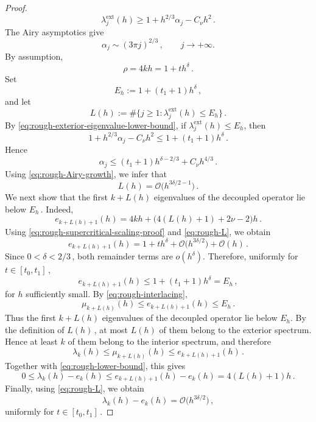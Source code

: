 \documentclass[11pt]{amsart}
\numberwithin{equation}{section}
\theoremstyle{remark}
\begin{document}
\begin{proof}
\begin{equation}
		\lambda_j^{\mathrm{ext}}(h)
		\geq
		1+h^{2/3}\alpha_j-C_\nu h^2\,.
	\end{equation}
	The Airy asymptotics give
	\begin{equation}\label{eq:rough-Airy-growth}
		\alpha_j\sim(3\pi j)^{2/3}\,,
		\qquad j\to+\infty.
	\end{equation}
	By assumption,
	\begin{equation}\label{eq:rough-supercritical-scaling-proof}
		\rho=4kh=1+th^\delta\,.
	\end{equation}
	Set
	\[
	E_h:=1+(t_1+1)h^\delta\,,
	\]
	and let
	\[
	L(h)
	:=
	\#\bigl\{j\geq1:
	\lambda_j^{\mathrm{ext}}(h)\leq E_h\bigr\}\,.
	\]
	By \eqref{eq:rough-exterior-eigenvalue-lower-bound}, if
	$\lambda_j^{\mathrm{ext}}(h)\leq E_h$, then
	\[
	1+h^{2/3}\alpha_j-C_\nu h^2
	\leq
	1+(t_1+1)h^\delta\,.
	\]
	Hence
	\[
	\alpha_j
	\leq
	(t_1+1)h^{\delta-2/3}
	+C_\nu h^{4/3}\,.
	\]
	Using \eqref{eq:rough-Airy-growth}, we infer that
	\begin{equation}\label{eq:rough-L}
		L(h)
		=
		\mathcal O\bigl(h^{3\delta/2-1}\bigr)\,.
	\end{equation}
	We next show that the first $k+L(h)$ eigenvalues of the
	decoupled operator lie below $E_h\,$. Indeed,
	\[
	e_{k+L(h)+1}(h)
	=
	4kh+
	\bigl(4(L(h)+1)+2\nu-2\bigr)h\,.
	\]
	Using \eqref{eq:rough-supercritical-scaling-proof} and
	\eqref{eq:rough-L}, we obtain
	\[
	e_{k+L(h)+1}(h)
	=
	1+th^\delta
	+\mathcal O\bigl(h^{3\delta/2}\bigr)
	+\mathcal O(h)\,.
	\]
	Since $0<\delta<2/3\,$, both remainder terms are $o(h^\delta)$.
	Therefore, uniformly for $t\in[t_0,t_1]\,$,
	\[
	e_{k+L(h)+1}(h)
	\leq
	1+(t_1+1)h^\delta
	=E_h\,,
	\]
	for $h$ sufficiently small. By \eqref{eq:rough-interlacing},
	\[
	\mu_{k+L(h)}(h)
	\leq
	e_{k+L(h)+1}(h)
	\leq E_h\,.
	\]
	Thus the first $k+L(h)$ eigenvalues of the decoupled operator lie
	below $E_h$. By the definition of $L(h)\,$, at most $L(h)$ of them
	belong to the exterior spectrum. Hence at least $k$ of them belong
	to the interior spectrum, and therefore
	\[
	\lambda_k(h)
	\leq
	\mu_{k+L(h)}(h)
	\leq
	e_{k+L(h)+1}(h)\,.
	\]
	Together with \eqref{eq:rough-lower-bound}, this gives
	\[
	0\leq\lambda_k(h)-e_k(h)
	\leq
	e_{k+L(h)+1}(h)-e_k(h)
	=
	4(L(h)+1)h\,.
	\]
	Finally, using \eqref{eq:rough-L}, we obtain
	\[
	\lambda_k(h)-e_k(h)
	=
	\mathcal O\bigl(h^{3\delta/2}\bigr)\,,
	\]
	uniformly for $t\in[t_0,t_1]\,$.
\end{proof}





\end{document}
